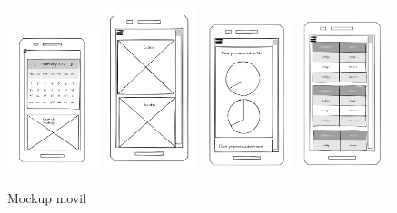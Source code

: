 \documentclass[11pt,spanish,listoffigures,listoftables]{tfgetsinf}
\begin{document}
 \begin{figure}[ht!] %
  \includegraphics[width=0.24\textwidth]{img/Vista_Calendario_MVL.png}
  \includegraphics[width=0.24\textwidth]{img/Vista_Opciones_MVL.png}
  \includegraphics[width=0.24\textwidth]{img/Vista_Informes_MVL.png}
  \includegraphics[width=0.24\textwidth]{img/Vista_Administracion_MVL.png}
  \caption{Mockup movil}
  \label{fig:VistaMVL}
\end{figure}
\end{document}
